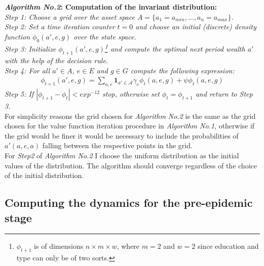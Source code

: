 \noindent\textbf{\textit{Algorithm No.2}: Computation of the invariant distribution:}\\

\noindent\textit{Step 1: Choose a grid over the asset space $A=\{a_{1}=a_{min},...,a_{n}=a_{max}\}$.\\
Step 2: Set a time iteration counter $t=0$ and choose an initial (discrete) density function $\phi_{0}(a',e,g)$ over the state space.\\
Step 3: Initialize $\phi_{t+1}(a',e,g)$\footnote{$\phi_{t+1}$ is of dimensions $n\times m\times w$, where $m=2$ and $w=2$ since education and type can only be of two sorts.} and compute the optimal next period wealth $a'$ with the help of the decision rule.\\
Step 4: For all $a'\in A$, $e \in E$ and $g \in G$ compute the following expression:}
\begin{align}
    \phi_{t+1}(a',e,g)=\sum_{a,e}\textbf{1}_{a'\in\mathcal{A}}\gamma_{e}\phi_{t}(a,e,g) + \psi\phi_{t}(a,e,g)
\end{align}
\textit{
Step 5: If $|\phi_{t+1}-\phi_{t}|<exp^{-12}$ stop, otherwise set $\phi_{t}=\phi_{t+1}$ and return to Step 3.}\\

For simplicity reasons the grid chosen for \textit{Algorithm No.2} is the same as the grid chosen for the value function iteration procedure in \textit{Algorithm No.1}, otherwise if the grid would be finer it would be necessary to include the probabilities of $a'(a,e,a)$ falling between the respective points in the grid.\\

For \textit{Step2} of \textit{Algorithm No.2} I choose the uniform distribution as the initial values of the distribution. The algorithm should converge regardless of the choice of the initial distribution. 


\subsection*{Computing the dynamics for the pre-epidemic stage}